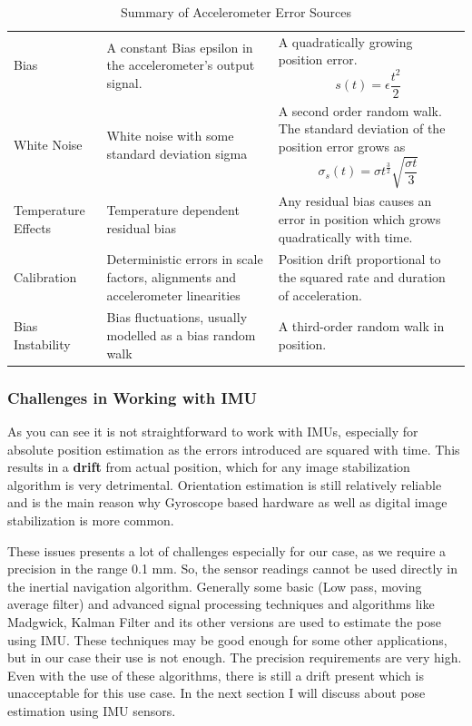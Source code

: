 \begin{table}[ht]
    \centering
\begin{tabular}{ l| L| L } \hline
      &  &  \\ \hline
     Bias & 
     A constant Bias epsilon in the accelerometer's output signal. & 
     A quadratically growing position error. \[s(t) = \epsilon  \frac{t^{2}}{2}\]   \\
     \hline
     White Noise & 
     White noise with some standard deviation sigma & 
     A second order random walk. The standard deviation of the position error grows as
     \[\sigma_s(t) = \sigma  t^{\frac{3}{2}}  \sqrt{\frac{\sigma  t}{3}}\]   \\
     \hline
     Temperature Effects & 
     Temperature dependent residual bias & 
     Any residual bias causes an error in position which grows quadratically with time. \\
     \hline
     Calibration & 
     Deterministic errors in scale factors, alignments and accelerometer linearities & 
     Position drift proportional to the squared rate and duration of acceleration. \\
     \hline
     Bias Instability & 
     Bias fluctuations, usually modelled as a bias random walk & 
     A third-order random walk in position. \\
     \hline
\end{tabular}
    \caption{Summary of Accelerometer Error Sources \citep{woodman2007introduction}}
    \label{tab:accel_error}
\end{table}

\subsubsection{Challenges in Working with IMU}
As you can see it is not straightforward to work with IMUs, especially for absolute position estimation as the errors introduced are squared with time. This results in a \textbf{drift} from actual position, which for any image stabilization algorithm is very detrimental. Orientation estimation is still relatively reliable and is the main reason why Gyroscope based hardware as well as digital image stabilization is more common. 

These issues presents a lot of challenges especially for our case, as we require a precision in the range 0.1 mm. So, the sensor readings cannot be used directly in the inertial navigation algorithm. Generally some basic (Low pass, moving average filter) and advanced signal processing techniques and algorithms like Madgwick, Kalman Filter and its other versions are used to estimate the pose using IMU. These techniques may be good enough for some other applications, but in our case their use is not enough. The precision requirements are very high. Even with the use of these algorithms, there is still a drift present which is unacceptable for this use case. In the next section I will discuss about pose estimation using IMU sensors.

